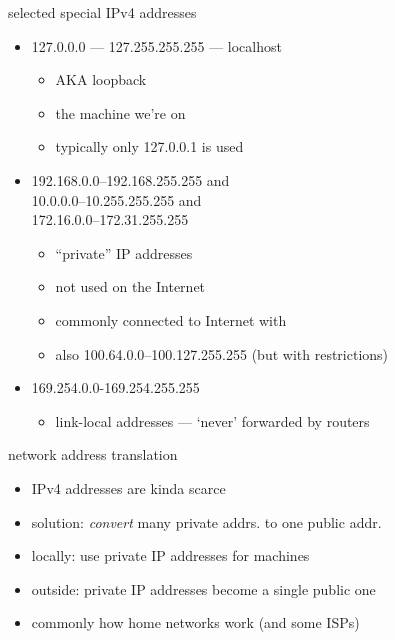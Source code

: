 \begin{frame}{selected special IPv4 addresses}
\begin{itemize}
\item 127.0.0.0 --- 127.255.255.255 --- localhost
    \begin{itemize}
    \item AKA loopback
    \item the machine we're on
    \item typically only 127.0.0.1 is used
    \end{itemize}
\item 192.168.0.0--192.168.255.255 and \\ 10.0.0.0--10.255.255.255 and \\ 172.16.0.0--172.31.255.255 
    \begin{itemize}
    \item ``private'' IP addresses
    \item not used on the Internet
    \item commonly connected to Internet with 
    \item also 100.64.0.0--100.127.255.255 (but with restrictions)
    \end{itemize}
\item 169.254.0.0-169.254.255.255
    \begin{itemize}
    \item link-local addresses --- `never' forwarded by routers
    \end{itemize}
\end{itemize}
\end{frame}

\begin{frame}{network address translation}
\begin{itemize}
\item IPv4 addresses are kinda scarce
\item solution: \textit{convert} many private addrs. to one public addr.
\item locally: use private IP addresses for machines
\item outside: private IP addresses become a single public one
\item commonly how home networks work (and some ISPs)
\end{itemize}
\end{frame}
